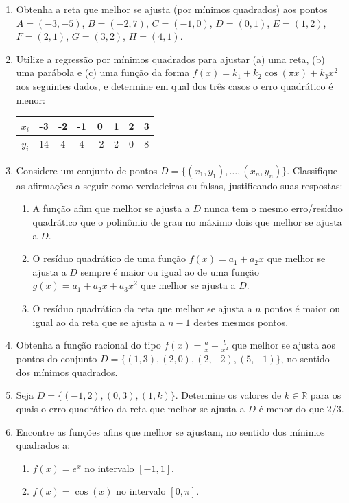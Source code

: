 \documentclass[12pt,a4paper]{article}
\newcommand*\R{\mathbb{R}}
\begin{document}
\begin{enumerate}
\item Obtenha a reta que melhor se ajusta (por mínimos quadrados) aos pontos
$A = (-3, -5)$,
$B = (-2,  7)$,
$C = (-1,  0)$,
$D = ( 0,  1)$,
$E = ( 1,  2)$,
$F = ( 2,  1)$,
$G = ( 3,  2)$,
$H = ( 4,  1)$.
\item Utilize a regressão por mínimos quadrados para ajustar (a) uma reta, (b) uma parábola e (c) uma função da forma $f(x) = k_1 + k_2 \cos(\pi x) + k_3 x^2$ aos seguintes dados, e determine em qual dos três casos o erro quadrático é menor:
\begin{center}
\begin{tabular}{|c|c|c|c|c|c|c|c|}
\hline
   $x_i$ & -3 & -2 & -1 &  0 & 1 & 2 & 3 \\ \hline
$y_i$ & 14 &  4 &  4 & -2 & 2 & 0 & 8 \\
\hline
\end{tabular}
\end{center}

\item Considere um conjunto de pontos $D = \{(x_1,y_1), \ldots, (x_n,y_n)\}$. Classifique as afirmações a seguir como verdadeiras ou falsas, justificando suas respostas:
\begin{enumerate}
\item A função afim que melhor se ajusta a $D$ nunca tem o mesmo erro/resíduo quadrático que o polinômio de grau no máximo dois que melhor se ajusta a $D$.
\item O resíduo quadrático de uma função $f(x) = a_1 + a_2 x$ que melhor se ajusta a $D$ sempre é maior ou igual ao de uma função $g(x) = a_1 + a_2 x + a_3 x^2$ que melhor se ajusta a $D$.
\item O resíduo quadrático da reta que melhor se ajusta a $n$ pontos é maior ou igual ao da reta que se ajusta a $n-1$ destes mesmos pontos.
\end{enumerate}

\item Obtenha a função racional do tipo $f(x) = \frac{a}{x} + \frac{b}{x^2}$ que melhor se ajusta aos pontos do conjunto $D = \{ (1, 3), (2, 0), (2, -2), (5, -1) \}$, no sentido dos mínimos quadrados.

\item Seja $D = \{ (-1,2), (0,3), (1, k) \}$. Determine os valores de $k \in \R$ para os quais o erro quadrático da reta que melhor se ajusta a $D$ é menor do que $2/3$.

\item Encontre as funções afins que melhor se ajustam, no sentido dos mínimos quadrados a:
\begin{multicols}{2}
\begin{enumerate}
   \item $f(x) = e^x$ no intervalo $[-1, 1]$.
   \item $f(x) = \cos(x)$ no intervalo $[0, \pi]$.
\end{enumerate}
\end{multicols}


\end{enumerate}
\end{document}
